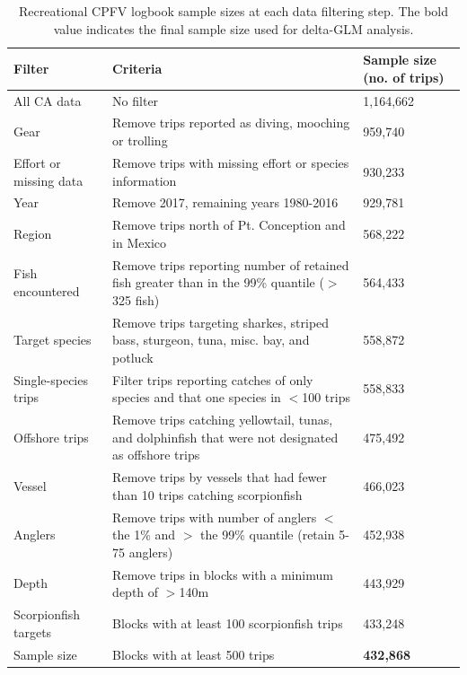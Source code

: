 \documentclass[12pt,]{article}
\begin{document}
\FloatBarrier

\begin{table}[ht]
\centering
\caption{Recreational CPFV logbook sample 
                                          sizes at each data filtering step.  
                                          The bold value indicates the final sample size 
                                          used for delta-GLM analysis.} 
\label{tab:Fleet5_RecPC_CPFVlogbook_filter}
\begin{tabular}{>{\raggedright}p{1.5in}>{\raggedright}p{3in}>{\raggedright}p{1in}}
  \hline
Filter & Criteria & Sample size (no. of trips) \\ 
  \hline
All CA data & No filter & 1,164,662 \\ 
  Gear & Remove trips reported as diving, mooching or trolling & 959,740 \\ 
  Effort or missing data & Remove trips with missing effort or species information & 930,233 \\ 
  Year & Remove 2017, remaining years 1980-2016 & 929,781 \\ 
  Region & Remove trips north of Pt. Conception and in Mexico & 568,222 \\ 
  Fish encountered & Remove trips reporting number of retained fish greater than in the 99\% quantile ($>$325 fish) & 564,433 \\ 
  Target species & Remove trips targeting sharkes, striped bass, sturgeon, tuna, misc. bay, and potluck & 558,872 \\ 
  Single-species trips & Filter trips reporting catches of only species and that one species in $<$100 trips & 558,833 \\ 
  Offshore trips & Remove trips catching yellowtail, tunas, and dolphinfish that were not designated as offshore trips & 475,492 \\ 
  Vessel & Remove trips by vessels that had fewer than 10 trips catching scorpionfish & 466,023 \\ 
  Anglers & Remove trips with number of anglers $<$ the 1\% and $>$ the 99\% quantile (retain 5-75 anglers) & 452,938 \\ 
  Depth & Remove trips in blocks with a minimum depth of $>$140m & 443,929 \\ 
  Scorpionfish targets & Blocks with at least 100 scorpionfish trips & 433,248 \\ 
  Sample size & Blocks with at least 500 trips & \textbf{432,868} \\ 
   \hline
\end{tabular}

\end{table}
\end{document}
